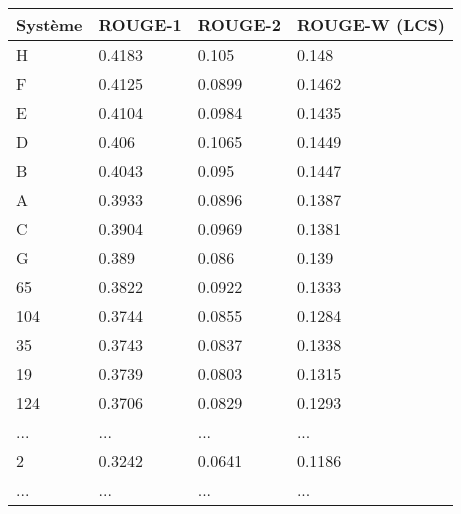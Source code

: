 \begin{tabular*}{\textwidth}{@{\extracolsep{\fill}} llll} 
\hline
\hline
Syst\`eme	& ROUGE-1	& ROUGE-2	& ROUGE-W (LCS)\\
\hline
H 			& 0.4183	& 0.105	 	& 0.148 \\
F 			& 0.4125	& 0.0899	& 0.1462 \\
E 			& 0.4104	& 0.0984	& 0.1435 \\
D 			& 0.406	 	& 0.1065	& 0.1449 \\
B 			& 0.4043	& 0.095	 	& 0.1447 \\
A 			& 0.3933	& 0.0896	& 0.1387 \\
C 			& 0.3904	& 0.0969	& 0.1381 \\
G 			& 0.389	 	& 0.086	 	& 0.139 \\
65			& 0.3822	& 0.0922	& 0.1333 \\
104			& 0.3744	& 0.0855	& 0.1284 \\
35			& 0.3743	& 0.0837	& 0.1338 \\
19			& 0.3739	& 0.0803	& 0.1315 \\
124			& 0.3706	& 0.0829	& 0.1293 \\
...			& ...		& ...		& ... \\
2			& 0.3242	& 0.0641	& 0.1186 \\
...			& ...		& ...		& ... \\
\hline
\hline
\end{tabular*}